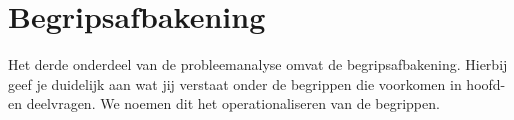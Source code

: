 \documentclass[10pt,a4paper,oneside]{report}
\begin{document}

\section{Begripsafbakening}
Het derde onderdeel van de probleemanalyse omvat de begripsafbakening. Hierbij geef je duidelijk aan wat jij verstaat onder de begrippen die voorkomen in hoofd- en deelvragen. We noemen dit het operationaliseren van de begrippen.
\end{document}

